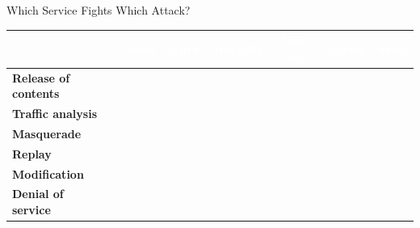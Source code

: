 \documentclass[aspectratio=169,11pt,xcolor={table}]{beamer}
\newcommand{\good}[1]{\textcolor{leaf}{\textbf{#1}}}
\begin{document}
\begin{frame}{Which Service Fights Which Attack?}
  \centering
  \renewcommand{\arraystretch}{1.35}
  \small
  \begin{tabular}{l c c c c c c}
    \toprule
    \rowcolor{navy} & \textcolor{white}{\textbf{Confid.}} & \textcolor{white}{\textbf{Auth.}} & \textcolor{white}{\textbf{Integrity}} & \textcolor{white}{\textbf{Non-rep.}} & \textcolor{white}{\textbf{Access}} & \textcolor{white}{\textbf{Avail.}}\\
    \midrule
    \textbf{Release of contents} & \good{\checkmark} & & & & \good{\checkmark} & \\
    \textbf{Traffic analysis}    & \good{\checkmark} & & & & & \\
    \textbf{Masquerade}          & & \good{\checkmark} & & & \good{\checkmark} & \\
    \textbf{Replay}              & & \good{\checkmark} & \good{\checkmark} & & & \\
    \textbf{Modification}        & & & \good{\checkmark} & \good{\checkmark} & & \\
    \textbf{Denial of service}   & & & & & & \good{\checkmark}\\
    \bottomrule
  \end{tabular}
  \vspace{4mm}

\end{frame}
\end{document}
